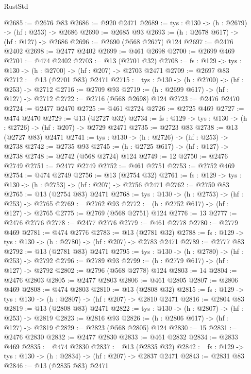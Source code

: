\begin{lexlean}{RustStd}
\begin{coremodule}
@2685 := @2676 @83
@2686 := @920 @2471
@2689 := {tys : @130} -> (h : @2679) -> (hf : @253) -> @2686
@2690 := @2685 @93
@2693 := (h : @2678 @617) -> (hf : @127) -> @2686
@2696 := @2690 (@568 @2677) @124
@2697 := @2476 @2402
@2698 := @2477 @2402
@2699 := @461 @2698
@2700 := @2699 @469
@2701 := @474 @2402
@2703 := @13 (@2701 @32)
@2708 := {fs : @129} -> {tys : @130} -> (h : @2700) -> (hf : @207) -> @2703 @2471
@2709 := @2697 @83
@2712 := @13 (@2701 @83) @2471
@2715 := {tys : @130} -> (h : @2700) -> (hf : @253) -> @2712
@2716 := @2709 @93
@2719 := (h : @2699 @617) -> (hf : @127) -> @2712
@2722 := @2716 (@568 @2698) @124
@2723 := @2476 @2470
@2724 := @2477 @2470
@2725 := @461 @2724
@2726 := @2725 @469
@2727 := @474 @2470
@2729 := @13 (@2727 @32)
@2734 := {fs : @129} -> {tys : @130} -> (h : @2726) -> (hf : @207) -> @2729 @2471
@2735 := @2723 @83
@2738 := @13 (@2727 @83) @2471
@2741 := {tys : @130} -> (h : @2726) -> (hf : @253) -> @2738
@2742 := @2735 @93
@2745 := (h : @2725 @617) -> (hf : @127) -> @2738
@2748 := @2742 (@568 @2724) @124
@2749 := 12
@2750 := @2476 @2749
@2751 := @2477 @2749
@2752 := @461 @2751
@2753 := @2752 @469
@2754 := @474 @2749
@2756 := @13 (@2754 @32)
@2761 := {fs : @129} -> {tys : @130} -> (h : @2753) -> (hf : @207) -> @2756 @2471
@2762 := @2750 @83
@2765 := @13 (@2754 @83) @2471
@2768 := {tys : @130} -> (h : @2753) -> (hf : @253) -> @2765
@2769 := @2762 @93
@2772 := (h : @2752 @617) -> (hf : @127) -> @2765
@2775 := @2769 (@568 @2751) @124
@2776 := 13
@2777 := @2476 @2776
@2778 := @2477 @2776
@2779 := @461 @2778
@2780 := @2779 @469
@2781 := @474 @2776
@2783 := @13 (@2781 @32)
@2788 := {fs : @129} -> {tys : @130} -> (h : @2780) -> (hf : @207) -> @2783 @2471
@2789 := @2777 @83
@2792 := @13 (@2781 @83) @2471
@2795 := {tys : @130} -> (h : @2780) -> (hf : @253) -> @2792
@2796 := @2789 @93
@2799 := (h : @2779 @617) -> (hf : @127) -> @2792
@2802 := @2796 (@568 @2778) @124
@2803 := 14
@2804 := @2476 @2803
@2805 := @2477 @2803
@2806 := @461 @2805
@2807 := @2806 @469
@2808 := @474 @2803
@2810 := @13 (@2808 @32)
@2815 := {fs : @129} -> {tys : @130} -> (h : @2807) -> (hf : @207) -> @2810 @2471
@2816 := @2804 @83
@2819 := @13 (@2808 @83) @2471
@2822 := {tys : @130} -> (h : @2807) -> (hf : @253) -> @2819
@2823 := @2816 @93
@2826 := (h : @2806 @617) -> (hf : @127) -> @2819
@2829 := @2823 (@568 @2805) @124
@2830 := 15
@2831 := @2476 @2830
@2832 := @2477 @2830
@2833 := @461 @2832
@2834 := @2833 @469
@2835 := @474 @2830
@2837 := @13 (@2835 @32)
@2842 := {fs : @129} -> {tys : @130} -> (h : @2834) -> (hf : @207) -> @2837 @2471
@2843 := @2831 @83
@2846 := @13 (@2835 @83) @2471

\end{coremodule}
\end{lexlean}
